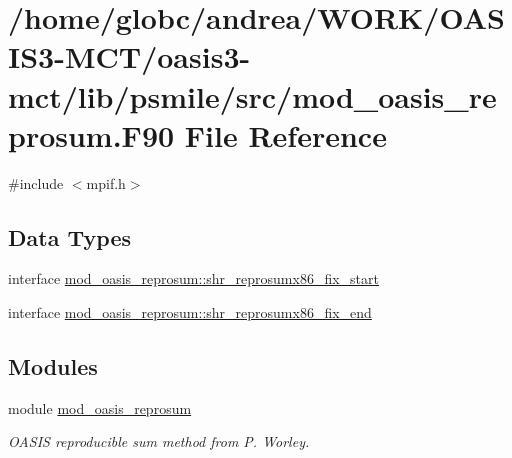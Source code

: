 \hypertarget{mod__oasis__reprosum_8_f90}{}\section{/home/globc/andrea/\+W\+O\+R\+K/\+O\+A\+S\+I\+S3-\/\+M\+C\+T/oasis3-\/mct/lib/psmile/src/mod\+\_\+oasis\+\_\+reprosum.F90 File Reference}
\label{mod__oasis__reprosum_8_f90}
{\ttfamily \#include $<$mpif.\+h$>$}\newline
\subsection*{Data Types}
\begin{DoxyCompactItemize}
\item 
interface \hyperlink{interfacemod__oasis__reprosum_1_1shr__reprosumx86__fix__start}{mod\+\_\+oasis\+\_\+reprosum\+::shr\+\_\+reprosumx86\+\_\+fix\+\_\+start}
\item 
interface \hyperlink{interfacemod__oasis__reprosum_1_1shr__reprosumx86__fix__end}{mod\+\_\+oasis\+\_\+reprosum\+::shr\+\_\+reprosumx86\+\_\+fix\+\_\+end}
\end{DoxyCompactItemize}
\subsection*{Modules}
\begin{DoxyCompactItemize}
\item 
module \hyperlink{namespacemod__oasis__reprosum}{mod\+\_\+oasis\+\_\+reprosum}
\begin{DoxyCompactList}\small\item\em O\+A\+S\+IS reproducible sum method from P. Worley. \end{DoxyCompactList}\end{DoxyCompactItemize}
